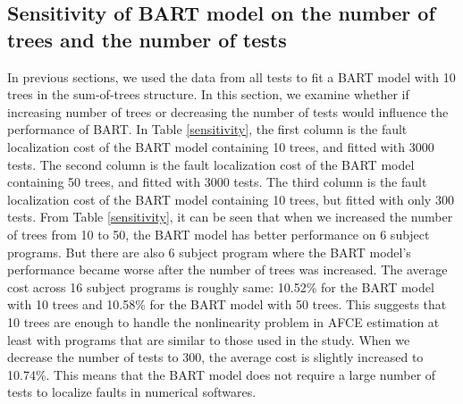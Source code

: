 \subsection{Sensitivity of BART model on the number of trees and  the number of tests}\label{BARTsensitivity}

In previous sections, we used the data from all tests to fit a BART model with 10 trees in the sum-of-trees structure. In this section, we examine whether if increasing number of trees or decreasing the number of tests would influence the performance of BART. In Table \ref{sensitivity}, the first column is the fault localization cost of the BART model containing 10 trees, and fitted with 3000 tests. The second column is the fault localization cost of the BART model containing 50 trees, and fitted with 3000 tests. The third column is the fault localization cost of the BART model containing 10 trees, but fitted with only 300 tests. From Table \ref{sensitivity}, it can be seen that when we increased the number of trees from 10 to 50, the BART model has better performance on 6 subject programs. But there are also 6 subject program where the BART model's performance became worse after the number of trees was increased. The average cost across 16 subject programs is roughly same: 10.52\% for the BART model with 10 trees and 10.58\% for the BART model with 50 trees. This suggests that 10 trees are enough to handle the nonlinearity problem in AFCE estimation at least with programs that are similar to those used in the study.  When we decrease the number of tests to 300, the average cost is slightly increased to 10.74\%.  This means that the BART model does not require a large number of tests to localize faults in numerical softwares.

